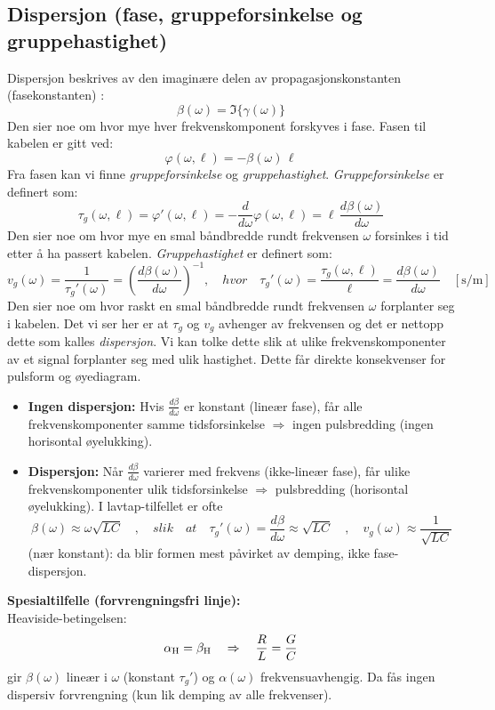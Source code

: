 \subsection{Dispersjon (fase, gruppeforsinkelse og gruppehastighet)}
Dispersjon beskrives av den imaginære delen av propagasjonskonstanten (fasekonstanten) \cite{HaytBuck2018}:
\[
    \beta(\omega)=\Im\{\gamma(\omega)\}
\]
Den sier noe om hvor mye hver frekvenskomponent forskyves i fase.
Fasen til kabelen er gitt ved:
\[
\varphi(\omega,\ell) = -\beta(\omega)\,\ell
\]
Fra fasen kan vi finne \emph{gruppeforsinkelse} og \emph{gruppehastighet}.
\emph{Gruppeforsinkelse} er definert som:
\[
\tau_g(\omega,\ell) = \varphi'(\omega,\ell) = -\frac{d}{d\omega}\varphi(\omega,\ell) = \ell\,\frac{d\beta(\omega)}{d\omega}
\]
Den sier noe om hvor mye en smal båndbredde rundt frekvensen \(\omega\) forsinkes i tid etter å ha passert kabelen. \emph{Gruppehastighet} er definert som:
\[
v_g(\omega) = \frac{1}{\tau_{g}'(\omega)} = \left(\frac{d\beta(\omega)}{d\omega}\right)^{-1}, \quad hvor \quad \tau_g'(\omega) = \frac{\tau_g(\omega,\ell)}{\ell} = \frac{d\beta(\omega)}{d\omega} \quad [\mathrm{s/m}]
\]
\noindent Den sier noe om hvor raskt en smal båndbredde rundt frekvensen \(\omega\) forplanter seg i kabelen. Det vi ser her er at \(\tau_g\) og \(v_g\) avhenger av frekvensen og det er nettopp dette som kalles \emph{dispersjon}. Vi kan tolke dette slik at ulike frekvenskomponenter av et signal forplanter seg med ulik hastighet. 
\clearpage
\noindent Dette får direkte konsekvenser for pulsform og øyediagram.\\
\begin{itemize}[leftmargin=2.8em,style=nextline]
  \item \textbf{Ingen dispersjon:} Hvis \(\frac{d\beta}{d\omega} \) er konstant (lineær fase), får alle frekvenskomponenter samme tidsforsinkelse \(\Rightarrow\) ingen pulsbredding (ingen horisontal øyelukking).\\
  \item \textbf{Dispersjon:} Når \(\frac{d\beta}{d\omega}\) varierer med frekvens (ikke-lineær fase), får ulike frekvenskomponenter ulik tidsforsinkelse \(\Rightarrow\) pulsbredding (horisontal øyelukking). I lavtap-tilfellet er ofte 
  \[
    \beta(\omega)\approx \omega\sqrt{LC}\quad,\quad slik\quad at \quad \tau_{g}'(\omega)=\frac{d\beta}{d\omega}\approx \sqrt{LC}\quad,\quad v_g(\omega)\approx \frac{1}{\sqrt{LC}}
  \]
  (nær konstant): da blir formen mest påvirket av demping, ikke fase-dispersjon.\\
\end{itemize}
\textbf{Spesialtilfelle (forvrengningsfri linje):}\\
Heaviside-betingelsen:
\[
    \alpha_{\mathrm{H}} = \beta_{\mathrm{H}} \quad \Rightarrow \quad \frac{R}{L}=\frac{G}{C}
\]
gir \(\beta(\omega)\) lineær i \(\omega\)
(konstant \(\tau_g'\)) og \(\alpha(\omega)\) frekvensuavhengig. Da fås ingen dispersiv forvrengning (kun lik demping av alle frekvenser).

